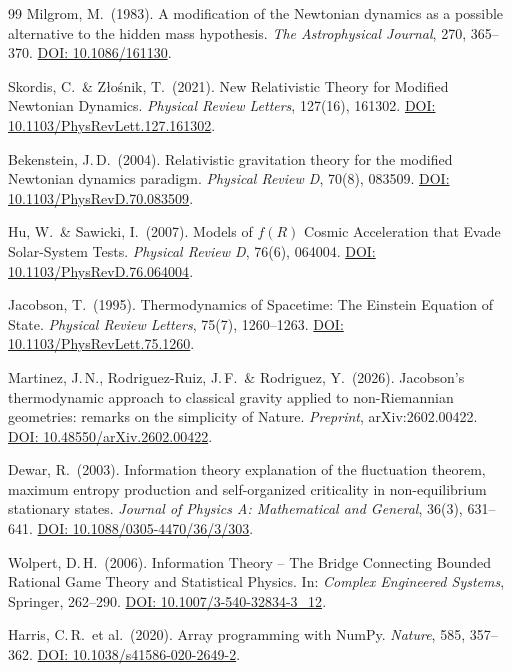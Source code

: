 \documentclass[aps,prd,twocolumn,superscriptaddress,nofootinbib]{revtex4-2}
\begin{document}
\begin{thebibliography}{99}
Milgrom, M.\ (1983).
A modification of the Newtonian dynamics as a possible alternative to the hidden mass hypothesis.
\textit{The Astrophysical Journal}, 270, 365--370.
\href{https://doi.org/10.1086/161130}{DOI: 10.1086/161130}.

Skordis, C.\ \& Z{\l}o\'snik, T.\ (2021).
New Relativistic Theory for Modified Newtonian Dynamics.
\textit{Physical Review Letters}, 127(16), 161302.
\href{https://doi.org/10.1103/PhysRevLett.127.161302}{DOI: 10.1103/PhysRevLett.127.161302}.

Bekenstein, J.\,D.\ (2004).
Relativistic gravitation theory for the modified Newtonian dynamics paradigm.
\textit{Physical Review D}, 70(8), 083509.
\href{https://doi.org/10.1103/PhysRevD.70.083509}{DOI: 10.1103/PhysRevD.70.083509}.

Hu, W.\ \& Sawicki, I.\ (2007).
Models of $f(R)$ Cosmic Acceleration that Evade Solar-System Tests.
\textit{Physical Review D}, 76(6), 064004.
\href{https://doi.org/10.1103/PhysRevD.76.064004}{DOI: 10.1103/PhysRevD.76.064004}.

Jacobson, T.\ (1995).
Thermodynamics of Spacetime: The Einstein Equation of State.
\textit{Physical Review Letters}, 75(7), 1260--1263.
\href{https://doi.org/10.1103/PhysRevLett.75.1260}{DOI: 10.1103/PhysRevLett.75.1260}.

Martinez, J.\,N., Rodriguez-Ruiz, J.\,F.\ \& Rodriguez, Y.\ (2026).
Jacobson's thermodynamic approach to classical gravity applied to non-Riemannian geometries: remarks on the simplicity of Nature.
\textit{Preprint}, arXiv:2602.00422.
\href{https://doi.org/10.48550/arXiv.2602.00422}{DOI: 10.48550/arXiv.2602.00422}.

Dewar, R.\ (2003).
Information theory explanation of the fluctuation theorem, maximum entropy production and self-organized criticality in non-equilibrium stationary states.
\textit{Journal of Physics A: Mathematical and General}, 36(3), 631--641.
\href{https://doi.org/10.1088/0305-4470/36/3/303}{DOI: 10.1088/0305-4470/36/3/303}.

Wolpert, D.\,H.\ (2006).
Information Theory -- The Bridge Connecting Bounded Rational Game Theory and Statistical Physics.
In: \textit{Complex Engineered Systems}, Springer, 262--290.
\href{https://doi.org/10.1007/3-540-32834-3_12}{DOI: 10.1007/3-540-32834-3\_12}.

Harris, C.\,R.\ et al.\ (2020).
Array programming with NumPy.
\textit{Nature}, 585, 357--362.
\href{https://doi.org/10.1038/s41586-020-2649-2}{DOI: 10.1038/s41586-020-2649-2}.


\end{thebibliography}
\end{document}
